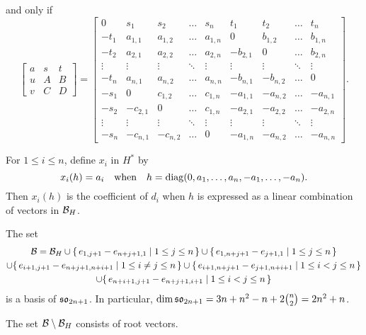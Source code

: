 and only if
\begin{equation}
  \label{eq:bigmat}
  \begin{bmatrix}
    a&s&t\\ u&A&B\\ v&C& D
  \end{bmatrix}
  =
  \begin{bmatrix}
    0&s_1&s_2&\dots&s_n &t_1&t_2&\dots&t_n\\
    -t_1& a_{1,1}&a_{1,2}&\dots&a_{1,n}&0&b_{1,2}&\dots&b_{1,n} \\
    -t_2& a_{2,1}&a_{2,2}&\dots&a_{2,n}&-b_{2,1}&0&\dots&b_{2,n} \\
    \vdots&\vdots&\vdots&\ddots&\vdots&\vdots&\vdots&\ddots&\vdots \\
    -t_n& a_{n,1}&a_{n,2}&\dots&a_{n,n}&-b_{n,1}&-b_{n,2}&\dots&0 \\
    -s_1& 0&c_{1,2}&\dots&c_{1,n}&-a_{1,1}&-a_{n,2}&\dots&-a_{n,1} \\
    -s_2& -c_{2,1}&0&\dots&c_{1,n}&-a_{2,1}&-a_{2,2}&\dots&-a_{2,n} \\
    \vdots & \vdots&\vdots&\ddots&\vdots&\vdots&\vdots&\ddots&\vdots \\
    -s_n& -c_{n,1}&-c_{n,2}&\dots&0&-a_{1,n}&-a_{n,2}&\dots&-a_{n,n}
  \end{bmatrix}.
\end{equation}

For $1\leq i\leq n$, define $x_i$ in $H^*$ by
\[
x_i(h)= a_i\quad\text{when}\quad h={\operatorname{diag}(0,a_1,\dots,a_n, -a_1,\dots,-a_n)}.
\]
Then $x_i(h)$ is the coefficient of $d_i$ when $h$ is expressed as a linear
combination of vectors in ${\mathcal B}_H$.

The set
\begin{multline*}
  {\mathcal B}={\mathcal B}_H \cup \{\, e_{1, j+1}-e_{n+j+1,1}\mid 1\leq j\leq n\,\} \cup \{\,
  e_{1, n+j+1}-e_{j+1,1}\mid 1\leq j\leq n\,\} \\
  \cup \{\, e_{i+1,j+1} -e_{n+j+1, n+i+1} \mid 1\leq i\ne j\leq n\,\} \cup
  \{\, e_{i+1,n+j+1} -e_{j+1, n+i+1} \mid 1\leq i< j\leq n\,\}  \\
  \cup \{\, e_{n+i+1,j+1} -e_{n+j+1, i+1}\mid 1\leq i< j\leq n\,\}
\end{multline*}
is a basis of $\mathfrak {so}_{2n+1}$. In particular, $\dim \mathfrak {so}_{2n+1}=
3n+n^2-n+2\binom n2= 2n^2+n$.

\begin{proposition}
  The set ${\mathcal B}\setminus {\mathcal B}_H$ consists of root vectors.
\end{proposition}

